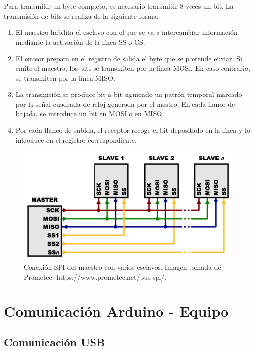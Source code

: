 Para transmitir un byte completo, es necesario transmitir 8 veces un bit. La transmisión de bits se realiza de la siguiente forma:
\begin{enumerate}
    \item El maestro habilita el esclavo con el que se va a intercambiar información mediante la activación de la línea SS o CS.
    \item El emisor prepara en el registro de salida el byte que se pretende enviar. Si emite el maestro, los bits se transmiten por la línea MOSI. En caso contrario, se transmiten por la línea MISO.
    \item La transmisión se produce bit a bit siguiendo un patrón temporal marcado por la señal cuadrada de reloj generada por el mestro. En cada flanco de bajada, se introduce un bit en MOSI o en MISO.
    \item Por cada flanco de subida, el receptor recoge el bit depositado en la línea y lo introduce en el registro correspondiente.
\end{enumerate}

\begin{figure}
\centering
\includegraphics[scale = 0.5]{capitulo_02/figuras_dir/SPI.jpg}
\caption{Conexión SPI del maestro con varios esclavos. Imagen tomada de Prometec: https://www.prometec.net/bus-spi/.}
\label{fig: SPI}
\end{figure}


\section{Comunicación Arduino - Equipo} %

\subsection{Comunicación USB} %

